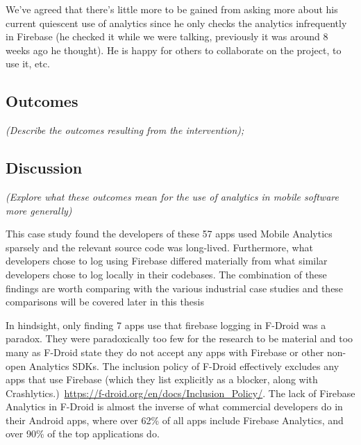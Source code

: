 We've agreed that there's little more to be gained from asking more about his current quiescent use of analytics since he only checks the analytics infrequently in Firebase (he checked it while we were talking, previously it was around 8 weeks ago he thought). He is happy for others to collaborate on the project, to use it, etc.

\subsection{Outcomes} 
\textit{(Describe the outcomes resulting from the intervention); }


\subsection{Discussion} 
\textit{(Explore what these outcomes mean for the use of analytics in mobile software more generally)}

This case study found the developers of these 57 apps used Mobile Analytics sparsely and the relevant source code was long-lived. Furthermore, what developers chose to log using Firebase differed materially from what similar developers chose to log locally in their codebases. The combination of these findings are worth comparing with the various industrial case studies and these comparisons will be covered later in this thesis %

In hindsight, only finding 7 apps use that firebase logging in F-Droid was a paradox. They were paradoxically too few for the research to be material and too many as F-Droid state they do not accept any apps with Firebase or other non-open Analytics SDKs. The inclusion policy of F-Droid effectively excludes any apps that use Firebase (which they list explicitly as a blocker, along with Crashlytics.)~\url{https://f-droid.org/en/docs/Inclusion_Policy/}. The lack of Firebase Analytics in F-Droid is almost the inverse of what commercial developers do in their Android apps, where over 62\% of all apps include Firebase Analytics, and over 90\% of the top applications do.


